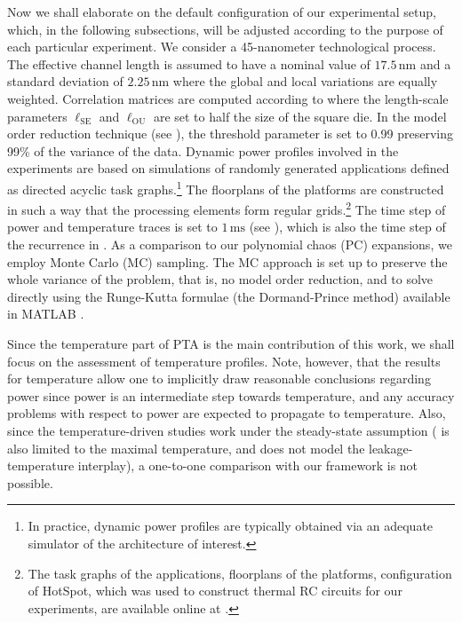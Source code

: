 Now we shall elaborate on the default configuration of our experimental setup,
which, in the following subsections, will be adjusted according to the purpose
of each particular experiment. We consider a 45-nanometer technological process.
The effective channel length is assumed to have a nominal value of
$17.5\,\text{nm}$ \cite{ptm} and a standard deviation of $2.25\,\text{nm}$ where
the global and local variations are equally weighted. Correlation matrices are
computed according to  where the length-scale
parameters $\ell_\mathrm{SE}$ and $\ell_\mathrm{OU}$ are set to half the size of
the square die. In the model order reduction technique (see
), the threshold parameter is set to 0.99
preserving 99\% of the variance of the data. Dynamic power profiles involved in
the experiments are based on simulations of randomly generated applications
defined as directed acyclic task graphs.\footnote{In practice, dynamic power
profiles are typically obtained via an adequate simulator of the architecture of
interest.} The floorplans of the platforms are constructed in such a way that
the processing elements form regular grids.\footnote{The task graphs of the
applications, floorplans of the platforms, configuration of HotSpot, which was
used to construct thermal RC circuits for our experiments, are available online
at \cite{sources}.} The time step of power and temperature traces is set to
$1\,\text{ms}$ (see ), which is also the time step of
the recurrence in . As a comparison to our polynomial chaos
(PC) expansions, we employ Monte Carlo (MC) sampling. The MC approach is set up
to preserve the whole variance of the problem, that is, no model order
reduction, and to solve  directly using the Runge-Kutta
formulae (the Dormand-Prince method) available in MATLAB \cite{matlab}.

Since the temperature part of PTA is the main contribution of this work, we
shall focus on the assessment of temperature profiles. Note, however, that the
results for temperature allow one to implicitly draw reasonable conclusions
regarding power since power is an intermediate step towards temperature, and any
accuracy problems with respect to power are expected to propagate to
temperature. Also, since the temperature-driven studies \cite{juan2011,
juan2012, huang2009a, lee2013} work under the steady-state assumption
(\cite{juan2011} is also limited to the maximal temperature, and
\cite{huang2009a} does not model the leakage-temperature interplay), a
one-to-one comparison with our framework is not possible.

